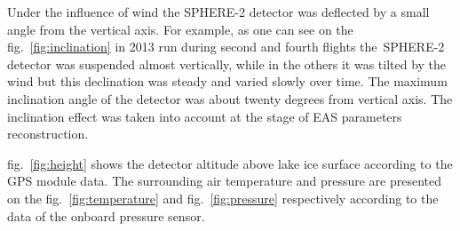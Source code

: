 \documentclass[final,5p,times,twocolumn]{elsarticle}
\begin{document}
Under the influence of wind the SPHERE-2 detector was deflected by a small angle from the vertical axis. For example, as one can see on the fig.~\ref{fig:inclination} in 2013 run during second and fourth flights the~\mbox{SPHERE-2} detector was suspended almost vertically, while in the others it was tilted by the wind but this declination was steady and varied slowly over time. The maximum inclination angle of the detector was about twenty degrees from vertical axis. The inclination effect was taken into account at the stage of EAS parameters reconstruction.

fig.~\ref{fig:height} shows the detector altitude above lake ice surface according to the GPS module data. The surrounding air temperature and pressure are presented on the fig.~\ref{fig:temperature} and fig.~\ref{fig:pressure} respectively according to the data of the onboard pressure sensor.
\end{document}
